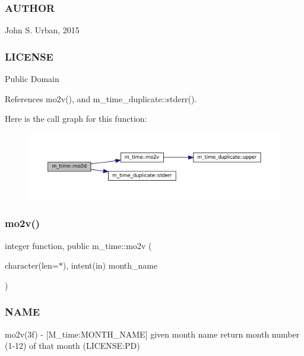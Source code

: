 \subsubsection*{A\+U\+T\+H\+OR}

John S. Urban, 2015 \subsubsection*{L\+I\+C\+E\+N\+SE}

Public Domain 

References mo2v(), and m\+\_\+time\+\_\+duplicate\+::stderr().

Here is the call graph for this function\+:\nopagebreak
\begin{figure}[H]
\begin{center}
\leavevmode
\includegraphics[width=350pt]{namespacem__time_a8188c7ed4e592c4f2388d28c75486726_cgraph}
\end{center}
\end{figure}
\mbox{\label{namespacem__time_ad7bf0886754757e8961e562f06cf3bb7}} 
\subsubsection{\texorpdfstring{mo2v()}{mo2v()}}
{\footnotesize\ttfamily integer function, public m\+\_\+time\+::mo2v (\begin{DoxyParamCaption}\item[{character(len=$\ast$), intent(in)}]{month\+\_\+name }\end{DoxyParamCaption})}



\subsubsection*{N\+A\+ME}

mo2v(3f) -\/ \mbox{[}M\+\_\+time\+:M\+O\+N\+T\+H\+\_\+\+N\+A\+ME\mbox{]} given month name return month number (1-\/12) of that month (L\+I\+C\+E\+N\+SE\+:PD) 

